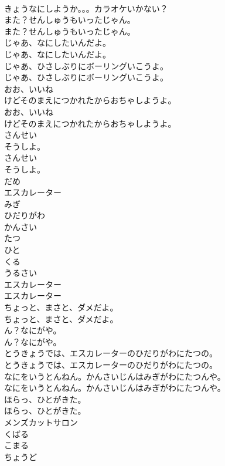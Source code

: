 \documentclass[8pt]{extreport}
\begin{document}
\begin{CJK}{UTF8}{min}
\\	きょうなにしようか。。。カラオケいかない？
\\	また？せんしゅうもいったじゃん。
\\	また？せんしゅうもいったじゃん。
\\	じゃあ、なにしたいんだよ。
\\	じゃあ、なにしたいんだよ。
\\	じゃあ、ひさしぶりにボーリングいこうよ。
\\	じゃあ、ひさしぶりにボーリングいこうよ。
\\	おお、いいね
\\	けどそのまえにつかれたからおちゃしようよ。
\\	おお、いいね
\\	けどそのまえにつかれたからおちゃしようよ。
\\	さんせい
\\	そうしよ。
\\	さんせい
\\	そうしよ。
\\	だめ
\\	エスカレーター
\\	みぎ
\\	ひだりがわ
\\	かんさい
\\	たつ
\\	ひと
\\	くる
\\	うるさい
\\	エスカレーター
\\	エスカレーター
\\	ちょっと、まさと、ダメだよ。
\\	ちょっと、まさと、ダメだよ。
\\	ん？なにがや。
\\	ん？なにがや。
\\	とうきょうでは、エスカレーターのひだりがわにたつの。
\\	とうきょうでは、エスカレーターのひだりがわにたつの。
\\	なにをいうとんねん。かんさいじんはみぎがわにたつんや。
\\	なにをいうとんねん。かんさいじんはみぎがわにたつんや。
\\	ほらっ、ひとがきた。
\\	ほらっ、ひとがきた。
\\	メンズカットサロン
\\	くばる
\\	こまる
\\	ちょうど

\end{CJK}
\end{document}

